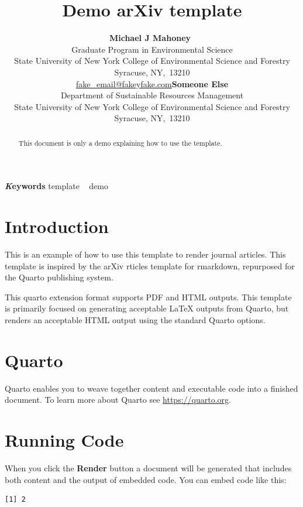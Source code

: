 \documentclass[
]{article}
\title{Demo arXiv template}
\author{\textbf{Michael J
Mahoney}~\orcidlink{0000-0003-2402-304X}\\Graduate Program in
Environmental Science\\State University of New York College of
Environmental Science and Forestry\\Syracuse,
NY,\ 13210\\\href{mailto:fake\_email@fakeyfake.com}{fake\_email@fakeyfake.com}\asep\textbf{Someone
Else}\\Department of Sustainable Resources Management\\State University
of New York College of Environmental Science and Forestry\\Syracuse,
NY,\ 13210\\}
\date{}
\begin{document}
\maketitle
\begin{abstract}
This document is only a demo explaining how to use the template.
\end{abstract}
{\bfseries \emph Keywords}
\def\sep{\textbullet\ }
template \sep 
demo

\ifdefined\Shaded\renewenvironment{Shaded}{\begin{tcolorbox}[enhanced, boxrule=0pt, frame hidden, sharp corners, interior hidden, borderline west={3pt}{0pt}{shadecolor}, breakable]}{\end{tcolorbox}}\fi

\hypertarget{sec-intro}{%
\section{Introduction}\label{sec-intro}}

This is an example of how to use this template to render journal
articles. This template is inspired by the arXiv rticles template for
rmarkdown, repurposed for the Quarto publishing system.

This quarto extension format supports PDF and HTML outputs. This
template is primarily focused on generating acceptable {\LaTeX} outputs
from Quarto, but renders an acceptable HTML output using the standard
Quarto options.

\hypertarget{quarto}{%
\section{Quarto}\label{quarto}}

Quarto enables you to weave together content and executable code into a
finished document. To learn more about Quarto see
\url{https://quarto.org}.

\hypertarget{running-code}{%
\section{Running Code}\label{running-code}}

When you click the \textbf{Render} button a document will be generated
that includes both content and the output of embedded code. You can
embed code like this:

\begin{verbatim}
[1] 2
\end{verbatim}
\end{document}
